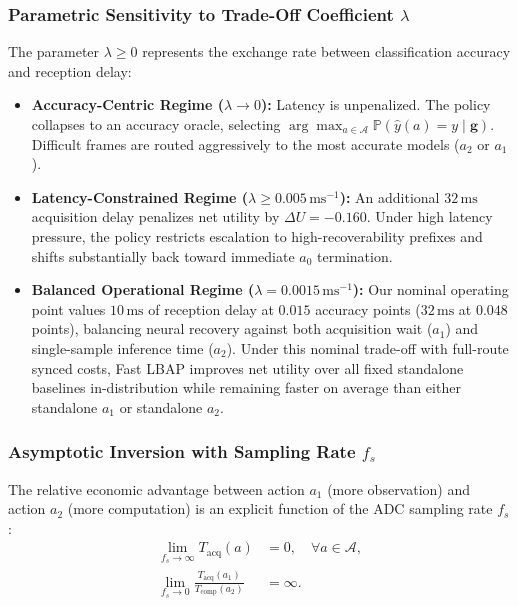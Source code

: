 \subsubsection{Parametric Sensitivity to Trade-Off Coefficient $\lambda$}
The parameter $\lambda \ge 0$ represents the exchange rate between classification accuracy and reception delay:
\begin{itemize}
    \item \textbf{Accuracy-Centric Regime ($\lambda \to 0$):} Latency is unpenalized. The policy collapses to an accuracy oracle, selecting $\arg\max_{a \in \mathcal{A}} \mathbb{P}(\hat{y}(a) = y \mid \mathbf{g})$. Difficult frames are routed aggressively to the most accurate models ($a_2$ or $a_1$).
    \item \textbf{Latency-Constrained Regime ($\lambda \ge 0.005\,\mathrm{ms}^{-1}$):} An additional $32\,\mathrm{ms}$ acquisition delay penalizes net utility by $\Delta U = -0.160$. Under high latency pressure, the policy restricts escalation to high-recoverability prefixes and shifts substantially back toward immediate $a_0$ termination.
    \item \textbf{Balanced Operational Regime ($\lambda = 0.0015\,\mathrm{ms}^{-1}$):} Our nominal operating point values $10\,\mathrm{ms}$ of reception delay at $0.015$ accuracy points ($32\,\mathrm{ms}$ at $0.048$ points), balancing neural recovery against both acquisition wait ($a_1$) and single-sample inference time ($a_2$). Under this nominal trade-off with full-route synced costs, Fast LBAP improves net utility over all fixed standalone baselines in-distribution while remaining faster on average than either standalone $a_1$ or standalone $a_2$.
\end{itemize}

\subsubsection{Asymptotic Inversion with Sampling Rate $f_s$}
The relative economic advantage between action $a_1$ (more observation) and action $a_2$ (more computation) is an explicit function of the ADC sampling rate $f_s$:
\begin{align}
    \lim_{f_s \to \infty} T_{\mathrm{acq}}(a) &= 0, \quad \forall a \in \mathcal{A}, \label{eq:limit_fs_inf} \\
    \lim_{f_s \to 0} \frac{T_{\mathrm{acq}}(a_1)}{T_{\mathrm{comp}}(a_2)} &= \infty. \label{eq:limit_fs_zero}
\end{align}


